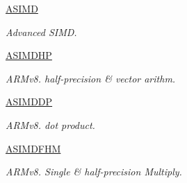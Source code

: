\begin{DoxyCompactItemize}
\hyperlink{classnumpy_1_1distutils_1_1ccompiler__opt_1_1__Config_ab3c9d30b9ea381b005be0833413374cb}{A\+S\+I\+MD}
\begin{DoxyCompactList}\small\item\em Advanced S\+I\+MD. \end{DoxyCompactList}\item 
\hyperlink{classnumpy_1_1distutils_1_1ccompiler__opt_1_1__Config_a52d901d6d1444d3c5966418214408582}{A\+S\+I\+M\+D\+HP}
\begin{DoxyCompactList}\small\item\em A\+R\+Mv8. half-\/precision \& vector arithm. \end{DoxyCompactList}\item 
\hyperlink{classnumpy_1_1distutils_1_1ccompiler__opt_1_1__Config_a29aa1fae3c381f4f8a5e24722a7af965}{A\+S\+I\+M\+D\+DP}
\begin{DoxyCompactList}\small\item\em A\+R\+Mv8. dot product. \end{DoxyCompactList}\item 
\hyperlink{classnumpy_1_1distutils_1_1ccompiler__opt_1_1__Config_a6d684d36bf85dc8dd7a1c32229dc828d}{A\+S\+I\+M\+D\+F\+HM}
\begin{DoxyCompactList}\small\item\em A\+R\+Mv8. Single \& half-\/precision Multiply. \end{DoxyCompactList}\end{DoxyCompactItemize}



